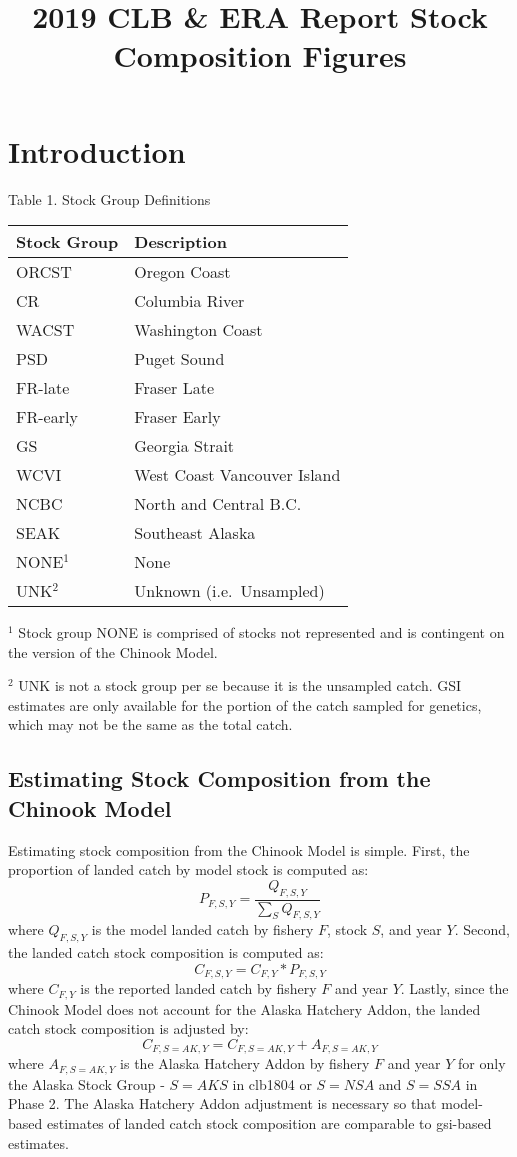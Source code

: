 \documentclass[]{article}
\title{2019 CLB \& ERA Report Stock Composition Figures}
\author{}
\date{}
\begin{document}
\maketitle

\section{Introduction}\label{introduction}

Table 1. Stock Group Definitions

\begin{longtable}[]{@{}ll@{}}
\toprule
Stock Group & Description\tabularnewline
\midrule
\endhead
ORCST & Oregon Coast\tabularnewline
CR & Columbia River\tabularnewline
WACST & Washington Coast\tabularnewline
PSD & Puget Sound\tabularnewline
FR-late & Fraser Late\tabularnewline
FR-early & Fraser Early\tabularnewline
GS & Georgia Strait\tabularnewline
WCVI & West Coast Vancouver Island\tabularnewline
NCBC & North and Central B.C.\tabularnewline
SEAK & Southeast Alaska\tabularnewline
NONE\(^1\) & None\tabularnewline
UNK\(^2\) & Unknown (i.e.~Unsampled)\tabularnewline
\bottomrule
\end{longtable}

\(^1\) Stock group NONE is comprised of stocks not represented and is
contingent on the version of the Chinook Model.

\(^2\) UNK is not a stock group per se because it is the unsampled
catch. GSI estimates are only available for the portion of the catch
sampled for genetics, which may not be the same as the total catch.

\subsection{Estimating Stock Composition from the Chinook
Model}\label{estimating-stock-composition-from-the-chinook-model}

Estimating stock composition from the Chinook Model is simple. First,
the proportion of landed catch by model stock is computed as:\\
\[ P_{F,S,Y} = \frac{Q_{F,S,Y}}{\sum_S{Q_{F,S,Y}}} \] where
\(Q_{F,S,Y}\) is the model landed catch by fishery \(F\), stock \(S\),
and year \(Y\). Second, the landed catch stock composition is computed
as: \[ C_{F,S,Y} = C_{F,Y}*P_{F,S,Y} \] where \(C_{F,Y}\) is the
reported landed catch by fishery \(F\) and year \(Y\). Lastly, since the
Chinook Model does not account for the Alaska Hatchery Addon, the landed
catch stock composition is adjusted by:
\[ C_{F,S=AK,Y} =  C_{F,S=AK,Y} + A_{F,S=AK,Y} \] where \(A_{F,S=AK,Y}\)
is the Alaska Hatchery Addon by fishery \(F\) and year \(Y\) for only
the Alaska Stock Group - \(S=AKS\) in clb1804 or \(S=NSA\) and \(S=SSA\)
in Phase 2. The Alaska Hatchery Addon adjustment is necessary so that
model-based estimates of landed catch stock composition are comparable
to gsi-based estimates.
\end{document}
